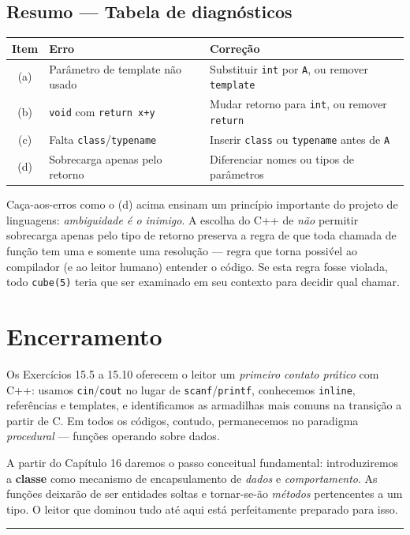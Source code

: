 \documentclass[11pt,a4paper]{article}
\begin{document}
\subsection*{Resumo --- Tabela de diagn\'osticos}

\begin{center}
\renewcommand{\arraystretch}{1.4}
\begin{tabular}{|c|p{5cm}|p{6.5cm}|}
\hline
\textbf{Item} & \textbf{Erro} & \textbf{Corre\c{c}\~ao} \\
\hline
(a) & Par\^ametro de template n\~ao usado & Substituir \texttt{int} por \texttt{A}, ou remover \texttt{template} \\
(b) & \texttt{void} com \texttt{return x+y} & Mudar retorno para \texttt{int}, ou remover \texttt{return} \\
(c) & Falta \texttt{class}/\texttt{typename} & Inserir \texttt{class} ou \texttt{typename} antes de \texttt{A} \\
(d) & Sobrecarga apenas pelo retorno & Diferenciar nomes ou tipos de par\^ametros \\
\hline
\end{tabular}
\end{center}

\begin{obseng}
Caça-aos-erros como o (d) acima ensinam um princ\'ipio importante do projeto de linguagens: \emph{ambiguidade \'e o inimigo}. A escolha do C++ de \emph{n\~ao} permitir sobrecarga apenas pelo tipo de retorno preserva a regra de que toda chamada de fun\c{c}\~ao tem uma e somente uma resolu\c{c}\~ao --- regra que torna possi\'vel ao compilador (e ao leitor humano) entender o c\'odigo. Se esta regra fosse violada, todo \texttt{cube(5)} teria que ser examinado em seu contexto para decidir qual chamar.
\end{obseng}

\section*{Encerramento}

Os Exerc\'icios 15.5 a 15.10 oferecem o leitor um \emph{primeiro contato pr\'atico} com C++: usamos \texttt{cin}/\texttt{cout} no lugar de \texttt{scanf}/\texttt{printf}, conhecemos \texttt{inline}, refer\^encias e templates, e identificamos as armadilhas mais comuns na transi\c{c}\~ao a partir de C. Em todos os c\'odigos, contudo, permanecemos no paradigma \emph{procedural} --- fun\c{c}\~oes operando sobre dados.

A partir do Cap\'itulo 16 daremos o passo conceitual fundamental: introduziremos a \textbf{classe} como mecanismo de encapsulamento de \emph{dados} e \emph{comportamento}. As fun\c{c}\~oes deixar\~ao de ser entidades soltas e tornar-se-\~ao \emph{m\'etodos} pertencentes a um tipo. O leitor que dominou tudo at\'e aqui est\'a perfeitamente preparado para isso.

\vspace{1em}
\begin{center}\rule{0.5\textwidth}{0.4pt}\end{center}
\end{document}
